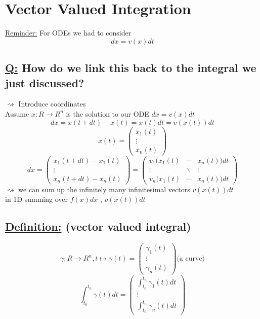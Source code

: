 \documentclass[a4paper, 12pt]{article}
\begin{document}
\section{Vector Valued Integration}
\underline{Reminder:} For ODEs we had to consider $$dx = v(x) dt$$
\subsection{\underline{Q:} How do we link this back to the integral we just discussed?}
$\rightsquigarrow$ Introduce coordinates\\ 
Assume $x:R \rightarrow R^n$ is the solution to our ODE $dx = v(x)dt$\\
$$dx = x(t+dt) - x(t) = \dot{x}(t)dt = v(x(t))dt$$
$$x(t) = 
\begin{pmatrix}
x_1(t)\\
\vdots \\
x_n(t)
\end{pmatrix}$$
$$dx =
\begin{pmatrix}
x_1(t+dt) - x_1(t)\\
\vdots \\
x_n(t+dt) - x_n(t)
\end{pmatrix}
=
\begin{pmatrix}
v_1(x_1(t)& \cdots & x_n(t))dt \\
\vdots & \ddots & \vdots\\
v_n(x_1(t)& \cdots & x_n(t))dt
\end{pmatrix}$$
$\rightsquigarrow$ we can sum up the infinitely many infinitesimal vectors $v(x(t))dt$\\
in 1D summing over $f(x)dx$ , $v(x(t))dt$\\
\subsection{\underline{Definition:} (vector valued integral)}
$$ \gamma : R \rightarrow R^n, t \mapsto \gamma(t) = \begin{pmatrix} \gamma_1 (t)\\ \vdots \\ \gamma_n (t) \end{pmatrix} \text{(a curve)}$$
$$\int_{t_0}^{t_n} \gamma (t) dt = \begin{pmatrix} \int_{t_0}^{t_n} \gamma_1 (t) dt \\ \vdots \\ \int_{t_0}^{t_n} \gamma_n (t) dt \end{pmatrix}$$
\end{document}

